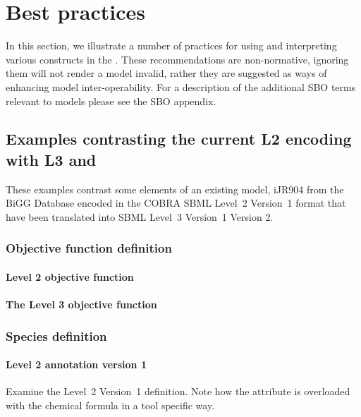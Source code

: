 
\section{Best practices}
\label{best-practices}

In this section, we illustrate a number of practices for using and
interpreting various constructs in the \FBCPackage.
These recommendations are non-normative, ignoring them will not render a model invalid, rather they are suggested as ways of enhancing model inter-operability. For a description of the additional SBO terms relevant to \FBC models please see the SBO appendix.

\subsection{Examples contrasting the current \SBML L2 encoding with L3 and \FBC}
\label{best-practices-cobraV2}
These examples contrast some elements of an existing model, iJR904 from the \textsf{BiGG} Database encoded in the \textsf{COBRA} SBML Level~2 Version~1 format \citep{ijr904, bigg, cobra} that have been translated into SBML Level~3 Version~1 \FBC Version 2.

\subsubsection*{Objective function definition}
\paragraph{\SBML Level 2 objective function}

\paragraph{The \SBML Level 3 objective function}
\protect{}

\subsubsection*{Species definition}
\paragraph{\SBML Level 2 \Species annotation version 1}
Examine the \SBML Level~2 Version~1 \Species definition. Note how the  attribute is overloaded with the chemical formula in a tool specific way.
%

